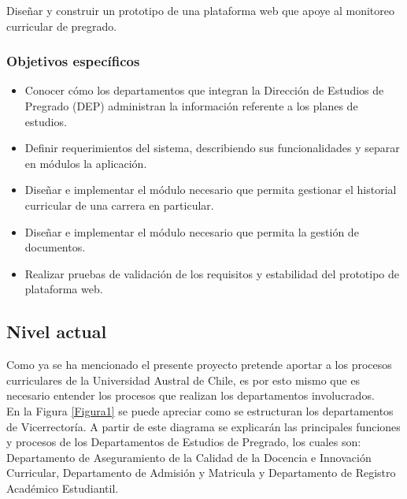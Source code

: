 	Diseñar y construir  un prototipo de una plataforma web que apoye al monitoreo curricular de pregrado. \\
	\vspace{-0.4cm}
	
	\subsubsection{Objetivos específicos}
	
	\begin{itemize}
		\item Conocer cómo los departamentos que integran la Dirección de Estudios de Pregrado (DEP) administran
		la información referente a los planes de estudios.
		\item  Definir requerimientos del sistema, describiendo sus funcionalidades y separar en módulos la aplicación.
		\item Diseñar e implementar el módulo necesario que permita gestionar el historial curricular de una carrera en particular.
		\item Diseñar e implementar el módulo necesario que permita la gestión de documentos.
		\item Realizar pruebas de validación de los requisitos y estabilidad del prototipo de plataforma web.
	\end{itemize}
	
	\subsection{Nivel actual}
	
		Como ya se ha mencionado el presente proyecto pretende aportar a los procesos curriculares de la Universidad Austral de Chile, es por esto mismo que es necesario entender los procesos que realizan los departamentos involucrados.
		\\
		
		En la Figura \ref{Figura1} se puede apreciar como se estructuran los departamentos de Vicerrectoría. A partir de este diagrama se explicarán las principales funciones y procesos de los Departamentos de Estudios de Pregrado, los cuales son: Departamento de Aseguramiento de la Calidad de la Docencia e Innovación Curricular, Departamento de Admisión y Matricula y Departamento de Registro Académico Estudiantil.
	
